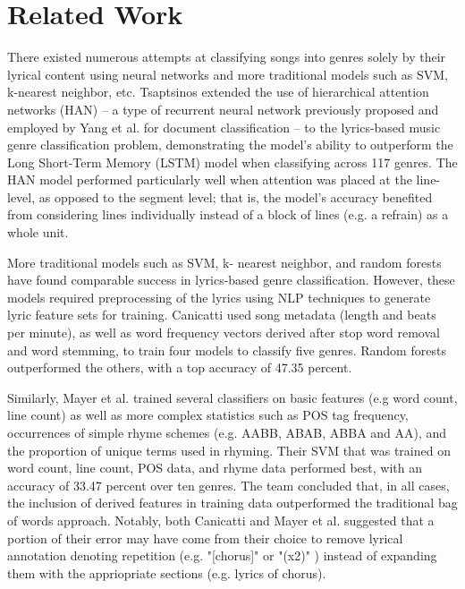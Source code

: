 \documentclass[journal]{IEEEtran}
\begin{document}

\section{Related Work}

There existed numerous attempts at classifying songs into genres solely by their lyrical content using neural networks and more traditional models such as SVM, k-nearest neighbor, etc.
Tsaptsinos \cite{tsaptsinos} extended the use of hierarchical attention networks (HAN) -- a type of recurrent neural network previously proposed and employed by Yang et al. \cite{Yang} for document classification -- to the lyrics-based music genre classification problem, demonstrating the model's ability to outperform the Long Short-Term Memory (LSTM) model when classifying across 117 genres. The HAN model performed particularly well when attention was placed at the line-level, as opposed to the segment level; that is, the model's accuracy benefited from considering lines individually instead of a block of lines (e.g. a refrain) as a whole unit. \par

More traditional models such as SVM, k- nearest neighbor, and random forests have found comparable success in lyrics-based genre classification. However, these models required preprocessing of the lyrics using NLP techniques to generate lyric feature sets for training. Canicatti \cite{canicatti} used song metadata (length and beats per minute), as well as word frequency vectors derived after stop word removal and word stemming, to train four models to classify five genres. Random forests outperformed the others, with a top accuracy of 47.35 percent. \par

Similarly, Mayer et al. \cite{mayer} trained several classifiers on basic features (e.g word count, line count) as well as more complex statistics such as POS tag frequency, occurrences of simple rhyme schemes (e.g. AABB, ABAB, ABBA and AA), and the proportion of unique terms used in rhyming. Their SVM that was trained on word count, line count, POS data, and rhyme data performed best, with an accuracy of 33.47 percent over ten genres. The team concluded that, in all cases, the inclusion of derived features in training data outperformed the traditional bag of words approach. Notably, both Canicatti and Mayer et al. suggested that a portion of their error may have come from their choice to remove lyrical annotation denoting repetition (e.g. "[chorus]" or "(x2)" ) instead of expanding them with the appriopriate sections (e.g. lyrics of chorus). \par
\end{document}
